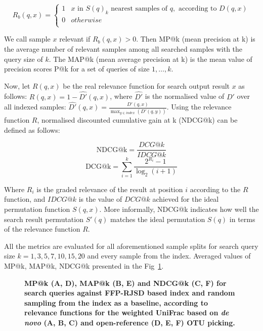 \documentclass[10pt,letterpaper]{article}
\begin{document}
\[ R_b(q, x)  =
  \begin{cases}
    1  & x \text{ in } S(q)_k \text{ nearest samples of } q, \text{ according to } D(q, x)\\
    0  &  otherwise \\
  \end{cases}
\] 

We call sample $x$ relevant if $R_b(q, x) > 0$. Then MP@k (mean precision at k) is the average number of relevant samples among all searched samples with the query size of $k$. 
The MAP@k (mean average precision at k) is the mean value of precision scores P@k for a set of queries of size $1, \dots, k$.

Now, let $R(q, x)$ be the real relevance function for search output result $x$ as follows:
$R(q, x) = 1 - \hat{D'}(q, x)$, where $\hat{D'}$ 
is the normalised value of $D'$ over all indexed samples: $\hat{D'}(q, x) = \frac{D'(q, x)} {\displaystyle\max_{y \in index} (D'(q, y)) }$.
Using the relevance function $R$, normalised discounted cumulative gain at k (NDCG@k) can be defined as follows:

$$\mathrm{NDCG@k} = \frac{DCG@k}{IDCG@k}$$
$${\mathrm{DCG@k} = \sum_{i=1}^{k} \frac{2^{R_i} - 1} {\log_{2}(i + 1)} }$$

Where $\displaystyle R_{i}$ is the graded relevance of the result at position $\displaystyle i$ according to the $R$ function,
and $IDCG@k$ is the value of $DCG@k$ achieved for the ideal permutation function $S(q, x)$.
More informally, NDCG@k indicates how well the search result permutation $S'(q)$ matches the ideal permutation $S(q)$ in terms of the relevance function $R$.

All the metrics are evaluated for all aforementioned sample splits for search query size $k = {1, 3, 5, 7, 10, 15, 20}$ and every sample from the index. Averaged values of MP@k, MAP@k, NDCG@k presented in the Fig~\ref{fig5}.


\begin{figure}[!h]
\caption{{\bf MP@k (A, D), MAP@k (B, E) and NDCG@k (C, F) for search queries against FFP-RJSD based index and random sampling from the index as a baseline, 
according to relevance functions for the weighted UniFrac based on \textit{de novo} (A, B, C) and open-reference (D, E, F) OTU picking.}}
\label{fig5}
\end{figure}
\end{document}
